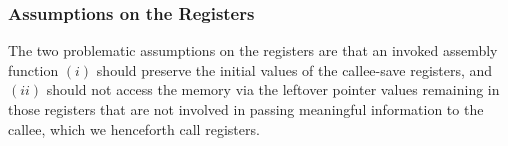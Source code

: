 


\subsubsection{Assumptions on the Registers}
\label{sec:overview-semantics-register}
%
The two problematic assumptions on the registers are that
an invoked assembly function $(i)$ should
preserve the initial values of the callee-save registers, and $(ii)$
should not access the memory via the leftover pointer values remaining
in those registers that are not involved in passing meaningful information to the callee,
which we henceforth call \emph{\nip{}} registers.

